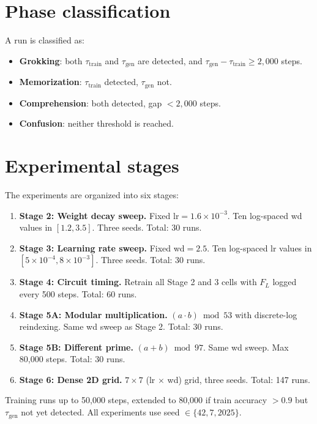 \documentclass[12pt,openany,a4paper]{book}
\newcommand{\taug}{\tau_{\mathrm{gen}}}
\newcommand{\flogit}{F_{L}}
\begin{document}
\section{Phase classification}

A run is classified as:
\begin{itemize}
  \item \textbf{Grokking}: both $\tau_{\mathrm{train}}$ and $\taug$ are detected, and $\taug - \tau_{\mathrm{train}} \geq 2{,}000$ steps.
  \item \textbf{Memorization}: $\tau_{\mathrm{train}}$ detected, $\taug$ not.
  \item \textbf{Comprehension}: both detected, gap $< 2{,}000$ steps.
  \item \textbf{Confusion}: neither threshold is reached.
\end{itemize}

\section{Experimental stages}

The experiments are organized into six stages:

\begin{enumerate}
  \item \textbf{Stage 2: Weight decay sweep.} Fixed lr$=1.6 \times 10^{-3}$. Ten log-spaced wd values in $[1.2, 3.5]$. Three seeds. Total: 30 runs.
  \item \textbf{Stage 3: Learning rate sweep.} Fixed wd$=2.5$. Ten log-spaced lr values in $[5 \times 10^{-4}, 8 \times 10^{-3}]$. Three seeds. Total: 30 runs.
  \item \textbf{Stage 4: Circuit timing.} Retrain all Stage 2 and 3 cells with $\flogit$ logged every 500 steps. Total: 60 runs.
  \item \textbf{Stage 5A: Modular multiplication.} $(a \cdot b) \bmod 53$ with discrete-log reindexing. Same wd sweep as Stage 2. Total: 30 runs.
  \item \textbf{Stage 5B: Different prime.} $(a+b) \bmod 97$. Same wd sweep. Max 80,000 steps. Total: 30 runs.
  \item \textbf{Stage 6: Dense 2D grid.} $7 \times 7$ (lr $\times$ wd) grid, three seeds. Total: 147 runs.
\end{enumerate}

Training runs up to 50,000 steps, extended to 80,000 if train accuracy $> 0.9$ but $\taug$ not yet detected. All experiments use seed $\in \{42, 7, 2025\}$.
\end{document}

